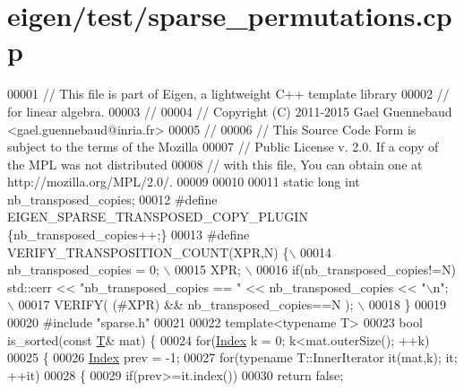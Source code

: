 \hypertarget{eigen_2test_2sparse__permutations_8cpp_source}{}\section{eigen/test/sparse\+\_\+permutations.cpp}
\label{eigen_2test_2sparse__permutations_8cpp_source}

\begin{DoxyCode}
00001 \textcolor{comment}{// This file is part of Eigen, a lightweight C++ template library}
00002 \textcolor{comment}{// for linear algebra.}
00003 \textcolor{comment}{//}
00004 \textcolor{comment}{// Copyright (C) 2011-2015 Gael Guennebaud <gael.guennebaud@inria.fr>}
00005 \textcolor{comment}{//}
00006 \textcolor{comment}{// This Source Code Form is subject to the terms of the Mozilla}
00007 \textcolor{comment}{// Public License v. 2.0. If a copy of the MPL was not distributed}
00008 \textcolor{comment}{// with this file, You can obtain one at http://mozilla.org/MPL/2.0/.}
00009 
00010 
00011 \textcolor{keyword}{static} \textcolor{keywordtype}{long} \textcolor{keywordtype}{int} nb\_transposed\_copies;
00012 \textcolor{preprocessor}{#define EIGEN\_SPARSE\_TRANSPOSED\_COPY\_PLUGIN \{nb\_transposed\_copies++;\}}
00013 \textcolor{preprocessor}{#define VERIFY\_TRANSPOSITION\_COUNT(XPR,N) \{\(\backslash\)}
00014 \textcolor{preprocessor}{    nb\_transposed\_copies = 0; \(\backslash\)}
00015 \textcolor{preprocessor}{    XPR; \(\backslash\)}
00016 \textcolor{preprocessor}{    if(nb\_transposed\_copies!=N) std::cerr << "nb\_transposed\_copies == " << nb\_transposed\_copies << "\(\backslash\)n"; \(\backslash\)}
00017 \textcolor{preprocessor}{    VERIFY( (#XPR) && nb\_transposed\_copies==N ); \(\backslash\)}
00018 \textcolor{preprocessor}{  \}}
00019 
00020 \textcolor{preprocessor}{#include "sparse.h"}
00021 
00022 \textcolor{keyword}{template}<\textcolor{keyword}{typename} T>
00023 \textcolor{keywordtype}{bool} is\_sorted(\textcolor{keyword}{const} \hyperlink{group___sparse_core___module}{T}& mat) \{
00024   \textcolor{keywordflow}{for}(\hyperlink{namespace_eigen_a62e77e0933482dafde8fe197d9a2cfde}{Index} k = 0; k<mat.outerSize(); ++k)
00025   \{
00026     \hyperlink{namespace_eigen_a62e77e0933482dafde8fe197d9a2cfde}{Index} prev = -1;
00027     \textcolor{keywordflow}{for}(\textcolor{keyword}{typename} T::InnerIterator it(mat,k); it; ++it)
00028     \{
00029       \textcolor{keywordflow}{if}(prev>=it.index())
00030         \textcolor{keywordflow}{return} \textcolor{keyword}{false};

\end{DoxyCode}
